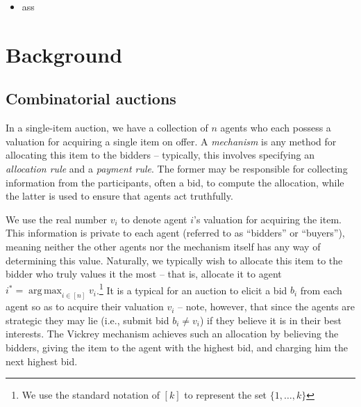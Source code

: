 \documentclass[10pt,a4paper]{article}
\theoremstyle{plain}
\theoremstyle{definition}
\DeclareMathOperator*{\argmax}{arg\,max}
\begin{document}
	\begin{itemize}
		\item ass
	\end{itemize}

\section{Background}
	\label{sec:background}

	\subsection{Combinatorial auctions}

	In a single-item auction, we have a collection of $n$ agents who each
	possess a valuation for acquiring a single item on offer. A
	\emph{mechanism} is any method for allocating this item to the bidders --
	typically, this involves specifying an \emph{allocation rule} and a
	\emph{payment rule}. The former may be responsible for collecting
	information from the participants, often a bid, to compute the allocation,
	while the latter is used to ensure that agents act truthfully.

	We use the real number $v_i$ to denote agent $i$'s valuation for acquiring
	the item. This information is private to each agent (referred to as
	``bidders'' or ``buyers''), meaning neither the other agents nor the
	mechanism itself has any way of determining this value. Naturally, we
	typically wish to allocate this item to the bidder who truly values it the
	most -- that is, allocate it to agent $i^* = \argmax_{i \in [n]}
	v_i$.\footnote{We use the standard notation of $[k]$ to represent the set
	$\{ 1, \ldots, k \}$} It is a typical for an auction to elicit a bid $b_i$
	from each agent so as to acquire their valuation $v_i$ -- note, however,
	that since the agents are strategic they may lie (i.e., submit bid $b_i
	\neq v_i$) if they believe it is in their best interests. The Vickrey
	mechanism \cite{Vickrey1961} achieves such an allocation by believing the
	bidders, giving the item to the agent with the highest bid, and charging
	him the next highest bid.
\end{document}
